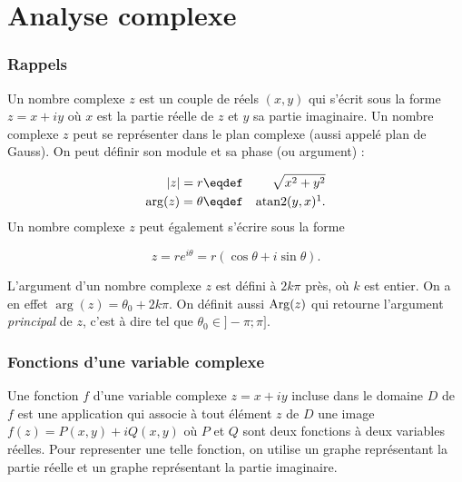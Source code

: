 
\part{Analyse complexe}
\section{Rappels}
\begin{mydef}
	Un nombre complexe $z$ est un couple de réels $(x,y)$ qui s'écrit
	sous la forme $z=x+iy$ où $x$ est la partie réelle de $z$ et $y$
	sa partie imaginaire. Un nombre complexe $z$ peut se représenter
	dans le plan complexe (aussi appelé plan de Gauss). On
	peut définir son module et sa phase (ou argument) :
	
		\begin{eqnarray*}
			|z| = r 					& \eqdef & \sqrt{x^2 + y^2}\\
			\arg(z) = \theta 	& \eqdef & \text{atan2}(y,x)\footnotemark.\\
		\end{eqnarray*}
	Un nombre complexe $z$ peut également s'écrire sous la forme
	
	$$z = re^{i\theta} = r(\cos\theta+i\sin\theta).$$
\end{mydef}

\begin{mydef}
	L'argument d'un nombre complexe $z$ est défini à $2k\pi$ près, où
	$k$ est entier. On a en effet $\arg(z) = \theta_0 + 2k\pi$. On définit aussi
	$\operatorname{Arg}(z)$ qui retourne l'argument \textit{principal} de $z$,
	c'est à dire tel que $\theta_0 \in ]-\pi;\pi]$.
\end{mydef}

\section{Fonctions d'une variable complexe}
\begin{mydef}
	Une fonction $f$ d'une variable complexe $z=x+iy$ incluse dans
	le domaine $D$ de $f$ est une application qui associe à tout
	élément $z$ de $D$ une image $f(z) = P(x,y) + iQ(x,y)$ où
	$P$ et $Q$ sont deux fonctions à deux variables réelles.
	Pour representer une telle fonction, on utilise un
	graphe représentant la partie réelle et un graphe
	représentant la partie imaginaire.
\end{mydef}

